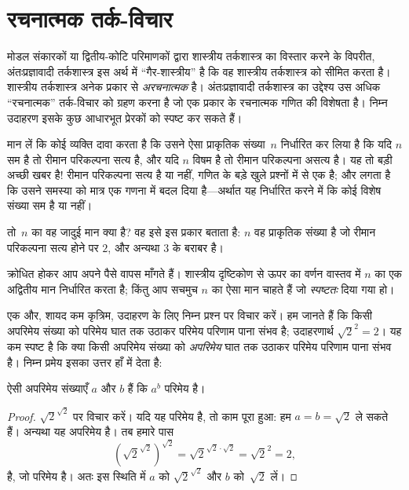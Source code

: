\documentclass[../../../include/open-logic-chapter]{subfiles}
\begin{document}

\section{रचनात्मक तर्क-विचार}

मोडल संकारकों या द्वितीय-कोटि परिमाणकों द्वारा शास्त्रीय तर्कशास्त्र का
विस्तार करने के विपरीत, अंतःप्रज्ञावादी तर्कशास्त्र इस अर्थ में
``गैर-शास्त्रीय'' है कि वह शास्त्रीय तर्कशास्त्र को सीमित करता है। शास्त्रीय
तर्कशास्त्र अनेक प्रकार से \emph{अरचनात्मक} है। अंतःप्रज्ञावादी तर्कशास्त्र
का उद्देश्य उस अधिक ``रचनात्मक'' तर्क-विचार को ग्रहण करना है जो एक प्रकार
के रचनात्मक गणित की विशेषता है। निम्न उदाहरण इसके कुछ आधारभूत प्रेरकों को
स्पष्ट कर सकते हैं।

मान लें कि कोई व्यक्ति दावा करता है कि उसने ऐसा प्राकृतिक संख्या~$n$
निर्धारित कर लिया है कि यदि $n$ सम है तो रीमान परिकल्पना सत्य है, और यदि
$n$ विषम है तो रीमान परिकल्पना असत्य है। यह तो बड़ी अच्छी खबर है!{} रीमान
परिकल्पना सत्य है या नहीं, गणित के बड़े खुले प्रश्नों में से एक है; और लगता
है कि उसने समस्या को मात्र एक गणना में बदल दिया है---अर्थात यह निर्धारित
करने में कि कोई विशेष संख्या सम है या नहीं।

तो~$n$ का वह जादुई मान क्या है? वह इसे इस प्रकार बताता है: $n$ वह प्राकृतिक
संख्या है जो रीमान परिकल्पना सत्य होने पर $2$, और अन्यथा $3$ के बराबर है।

क्रोधित होकर आप अपने पैसे वापस माँगते हैं। शास्त्रीय दृष्टिकोण से ऊपर का
वर्णन वास्तव में $n$ का एक अद्वितीय मान निर्धारित करता है; किंतु आप सचमुच
$n$ का ऐसा मान चाहते हैं जो \emph{स्पष्टतः} दिया गया हो।

एक और, शायद कम कृत्रिम, उदाहरण के लिए निम्न प्रश्न पर विचार करें। हम जानते
हैं कि किसी अपरिमेय संख्या को परिमेय घात तक उठाकर परिमेय परिणाम पाना संभव
है; उदाहरणार्थ $\sqrt{2}^2 = 2$। यह कम स्पष्ट है कि क्या किसी अपरिमेय
संख्या को \emph{अपरिमेय} घात तक उठाकर परिमेय परिणाम पाना संभव है। निम्न
प्रमेय इसका उत्तर हाँ में देता है:

\begin{thm}
ऐसी अपरिमेय संख्याएँ $a$ और $b$ हैं कि $a^b$ परिमेय है।
\end{thm}

\begin{proof}
$\sqrt{2}^{\sqrt{2}}$ पर विचार करें। यदि यह परिमेय है, तो काम पूरा हुआ:
हम $a = b = \sqrt{2}$ ले सकते हैं। अन्यथा यह अपरिमेय है। तब हमारे पास
\[
(\sqrt{2}^{\sqrt{2}})^{\sqrt{2}} = \sqrt{2}^{\sqrt{2} \cdot
  \sqrt{2}} = \sqrt{2}^2 = 2,
\]
है, जो परिमेय है। अतः इस स्थिति में $a$ को $\sqrt{2}^{\sqrt{2}}$ और $b$
को~$\sqrt 2$ लें।
\end{proof}
\end{document}
